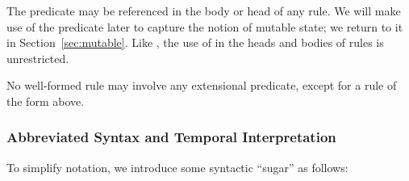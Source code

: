 The predicate  may be referenced in the body or head of any \lang rule.  
We will make use of the predicate  later to capture the notion of mutable state; we return to it in Section~\ref{sec:mutable}. 
Like , the use of  in the heads and bodies of rules is unrestricted.

\vspace{1.2em}
No well-formed \lang rule may involve any extensional predicate, except for a rule of the form above.

\subsubsection{Abbreviated Syntax and Temporal Interpretation}

\label{sec:abbrvsyntax}



To simplify \lang notation, we introduce some syntactic ``sugar'' as follows:

